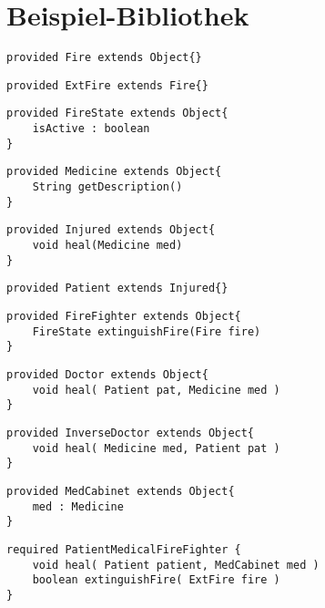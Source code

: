 \documentclass[a4paper,12pt]{article}
\begin{document}
\section{Beispiel-Bibliothek}



\begin{lstlisting}[style = dsl]
provided Fire extends Object{}
\end{lstlisting}

\begin{lstlisting}[style = dsl]
provided ExtFire extends Fire{}
\end{lstlisting}


\begin{lstlisting}[style = dsl]
provided FireState extends Object{
	isActive : boolean
}
\end{lstlisting}

\begin{lstlisting}[style = dsl]
provided Medicine extends Object{
	String getDescription()
}
\end{lstlisting}

\begin{lstlisting}[style = dsl]
provided Injured extends Object{
	void heal(Medicine med)	
}
\end{lstlisting}


\begin{lstlisting}[style = dsl]
provided Patient extends Injured{}
\end{lstlisting}
\begin{lstlisting}[style = dsl]
provided FireFighter extends Object{
	FireState extinguishFire(Fire fire)
}
\end{lstlisting}

\begin{lstlisting}[style = dsl]
provided Doctor extends Object{	
	void heal( Patient pat, Medicine med )
}
\end{lstlisting}


\begin{lstlisting}[style = dsl]
provided InverseDoctor extends Object{	
	void heal( Medicine med, Patient pat )
}
\end{lstlisting}

\begin{lstlisting}[style = dsl]
provided MedCabinet extends Object{
	med : Medicine
}
\end{lstlisting}

\begin{lstlisting}[style = dsl]
required PatientMedicalFireFighter {
	void heal( Patient patient, MedCabinet med )
	boolean extinguishFire( ExtFire fire )	
}
\end{lstlisting}
\end{document}
